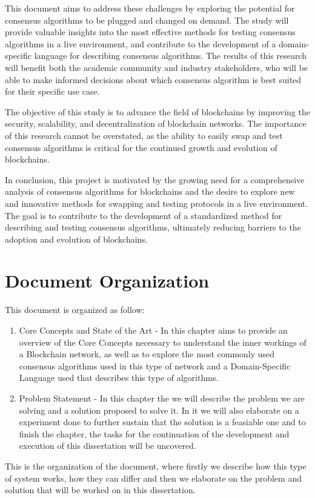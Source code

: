 This document aims to address these challenges by exploring the potential for consensus algorithms to be plugged and changed on demand. The study will provide valuable insights into the most effective methods for testing consensus algorithms in a live environment, and contribute to the development of a domain-specific language for describing consensus algorithms. The results of this research will benefit both the academic community and industry stakeholders, who will be able to make informed decisions about which consensus algorithm is best suited for their specific use case.

The objective of this study is to advance the field of blockchains by improving the security, scalability, and decentralization of blockchain networks. The importance of this research cannot be overstated, as the ability to easily swap and test consensus algorithms is critical for the continued growth and evolution of blockchains.

In conclusion, this project is motivated by the growing need for a comprehensive analysis of consensus algorithms for blockchains and the desire to explore new and innovative methods for swapping and testing protocols in a live environment. The goal is to contribute to the development of a standardized method for describing and testing consensus algorithms, ultimately reducing barriers to the adoption and evolution of blockchains.

\section{Document Organization}

This document is organized as follow:
\begin{enumerate}
    \item Core Concepts and State of the Art - In this chapter aims to provide an overview of the Core Concepts necessary to understand the inner workings of a Blockchain network, as well as to explore the most commonly used consensus algorithms used in this type of network and a Domain-Specific Language used that describes this type of algorithms.
    \item Problem Statement - In this chapter the we will describe the problem we are solving and a solution proposed to solve it. In it we will also elaborate on a experiment done to further sustain that the solution is a feasiable one and to finish the chapter, the tasks for the continuation of the development and execution of this dissertation will be uncovered.
\end{enumerate}

This is the organization of the document, where firstly we describe how this type of system works, how they can differ and then we elaborate on the problem and solution that will be worked on in this dissertation.
